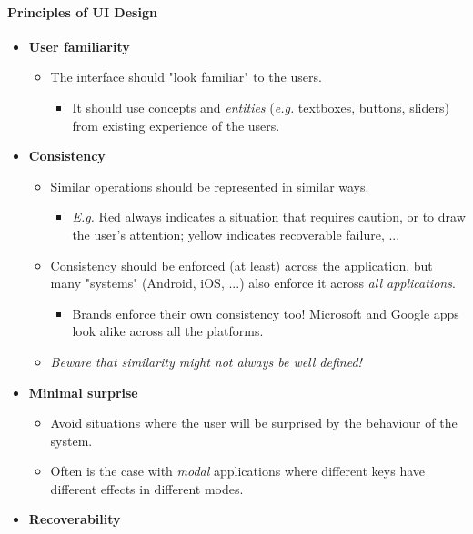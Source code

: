 \documentclass[a4paper]{article}
\providecommand{\tightlist}{%
  \setlength{\itemsep}{0pt}\setlength{\parskip}{0pt}}
\let\oldparagraph\paragraph
\renewcommand{\paragraph}[1]{\oldparagraph{#1}\mbox{}}
\begin{document}
\hypertarget{principles-of-ui-design}{%
\paragraph{Principles of UI Design}\label{principles-of-ui-design}}

\begin{itemize}
\item
  \textbf{User familiarity}

  \begin{itemize}
  \tightlist
  \item
    The interface should "look familiar" to the users.

    \begin{itemize}
    \tightlist
    \item
      It should use concepts and \emph{entities} (\emph{e.g.} textboxes,
      buttons, sliders) from existing experience of the users.
    \end{itemize}
  \end{itemize}
\item
  \textbf{Consistency}

  \begin{itemize}
  \tightlist
  \item
    Similar operations should be represented in similar ways.

    \begin{itemize}
    \tightlist
    \item
      \emph{E.g.} Red always indicates a situation that requires
      caution, or to draw the user's attention; yellow indicates
      recoverable failure, ...
    \end{itemize}
  \item
    Consistency should be enforced (at least) across the application,
    but many "systems" (Android, iOS, ...) also enforce it across
    \emph{all applications}.

    \begin{itemize}
    \tightlist
    \item
      Brands enforce their own consistency too! Microsoft and Google
      apps look alike across all the platforms.
    \end{itemize}
  \item
    \emph{Beware that similarity might not always be well defined!}
  \end{itemize}
\item
  \textbf{Minimal surprise}

  \begin{itemize}
  \tightlist
  \item
    Avoid situations where the user will be surprised by the behaviour
    of the system.
  \item
    Often is the case with \emph{modal} applications where different
    keys have different effects in different modes.
  \end{itemize}
\item
  \textbf{Recoverability}


\end{itemize}
\end{document}
